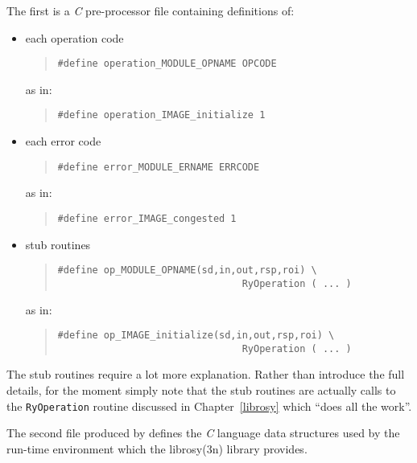 The first is a {\em C\/} pre-processor file containing definitions of:
\begin{itemize}
\item	each operation code
\begin{quote}\small\begin{verbatim}
#define operation_MODULE_OPNAME OPCODE
\end{verbatim}\end{quote}
	as in:
\begin{quote}\small\begin{verbatim}
#define operation_IMAGE_initialize 1
\end{verbatim}\end{quote}

\item	each error code
\begin{quote}\small\begin{verbatim}
#define error_MODULE_ERNAME ERRCODE
\end{verbatim}
\end{quote}
	as in:
\begin{quote}\small\begin{verbatim}
#define error_IMAGE_congested 1
\end{verbatim}
\end{quote}

\item	stub routines
\begin{quote}\small\begin{verbatim}
#define op_MODULE_OPNAME(sd,in,out,rsp,roi) \
                                RyOperation ( ... )
\end{verbatim}\end{quote}
	as in:
\begin{quote}\small\begin{verbatim}
#define op_IMAGE_initialize(sd,in,out,rsp,roi) \
                                RyOperation ( ... )
\end{verbatim}\end{quote}
\end{itemize}
The stub routines require a lot more explanation.
Rather than introduce the full details,
for the moment simply note that the stub routines are actually calls to the
\verb"RyOperation" routine discussed in Chapter~\ref{librosy} which
``does all the work''.

The second file produced by  defines the {\em C\/} language
data structures used by the run-time environment which the \man librosy(3n)
library provides.

